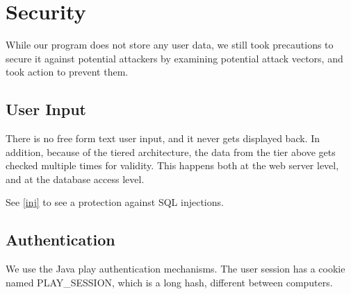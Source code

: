 \section{Security}

While our program does not store any user data,
we still took precautions to secure it against potential attackers by examining 
potential attack vectors, and took action to prevent them.

\subsection{User Input}
There is no free form text user input, and it never gets displayed back.
In addition, because of the tiered architecture, the data from the tier above gets checked multiple times for validity.
This happens both at the web server level, and at the database access level.

See \ref{inj} to see a protection against SQL injections.

\subsection{Authentication}
We use the Java play authentication mechanisms.
The user session has a cookie named PLAY\_SESSION, which is a long hash, different between computers.

